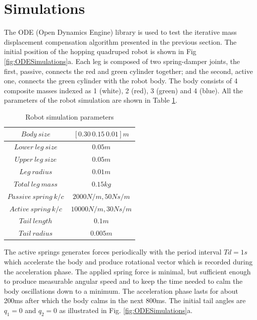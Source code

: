 \section{Simulations}\label{sec:simulation}

The ODE (Open Dynamics Engine) library \cite{ode:2008} is used to test the iterative mass displacement compensation algorithm presented in the previous section. The initial position of the hopping quadruped robot is shown in Fig \ref{fig:ODESimulations}a. Each leg is composed of two spring-damper joints, the first, passive, connects the red and green cylinder together; and the second, active one, connects the green cylinder with the robot body. The body consists of 4 composite masses indexed as 1 (white), 2 (red), 3 (green) and 4 (blue). All the parameters of the robot simulation are shown in Table \ref{tab:RobotDimensions}.

\begin{table}[!t]
\centering
\begin{tabular}{|c|c|}
	\hline
	$Body\: size$ &  $[0.30\: 0.15\: 0.01]m$ \\
	\hline
	$Lower\:leg\:size$ &  $0.05m$ \\
	\hline
	$Upper\:leg\:size$ &  $0.05m$ \\
	\hline
	$Leg\:radius$ &  $0.01m$ \\
	\hline
	$Total\:leg\:mass$ &  $0.15kg$ \\
	\hline
	$Passive\:spring\:k/c$ &  $2000N/m, 50Ns/m$ \\
	\hline
	$Active\:spring\:k/c$ &  $10000N/m, 30Ns/m$ \\
	\hline
	$Tail\:length$ &  $0.1m$ \\
	\hline
	$Tail\:radius$ &  $0.005m$ \\
	\hline
\end{tabular}
\caption{Robot simulation parameters}\label{tab:RobotDimensions}
\end{table}



The active springs generates forces periodically with the period interval $Td=1s$ which accelerate the body and produce rotational vector which is recorded during the acceleration phase. The applied spring force is minimal, but sufficient enough to produce measurable angular speed and to keep the time needed to calm the body oscillations down to a minimum. The acceleration phase lasts for about 200ms after which the body calms in the next 800ms. The initial tail angles are $q_1=0$ and $q_2=0$ as illustrated in Fig. \ref{fig:ODESimulations}a.

